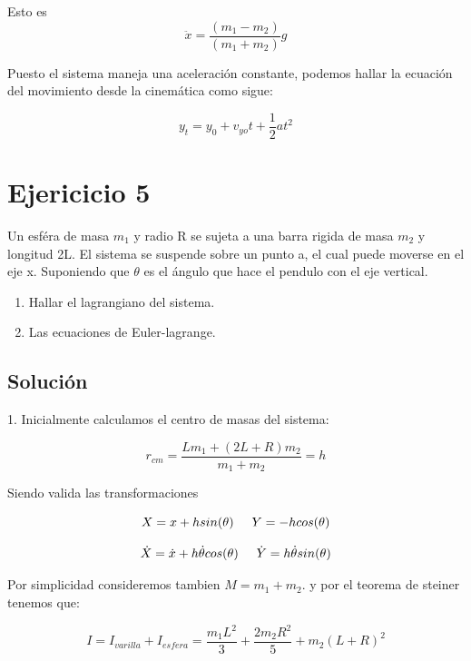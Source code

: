 \documentclass[12 pt]{article}
\begin{document}
Esto es
\begin{equation*}
\ddot{x}= \dfrac{(m_{1}-m_{2})}{(m_{1}+m_{2})} g
\end{equation*}

Puesto el sistema maneja una aceleración constante, podemos hallar la ecuación del movimiento desde la cinemática como sigue:

$$ y_{t}= y_{0}+v_{yo}t+\frac{1}{2}at^{2} $$

\section*{Ejericicio 5}
Un esféra de masa $m_{1}$ y radio R se sujeta a una barra rigida de  masa $m_{2}$ y longitud 2L. El sistema se suspende sobre un punto a, el cual puede moverse en el eje x.
Suponiendo que $\theta$ es el ángulo que hace el pendulo con el eje vertical.

\begin{enumerate}
	\item Hallar el lagrangiano del sistema.
	\item Las ecuaciones de Euler-lagrange.
\end{enumerate}



\subsection*{Solución}

1. Inicialmente calculamos el centro de masas del sistema:

\begin{equation*}
r_{cm}= \dfrac{L m_{1} + (2L + R)m_{2}}{m_{1}+m_{2}} =h
\end{equation*}

Siendo valida las transformaciones


\begin{equation*}
X = x + h sin(\theta) \hspace{0.5cm} Y= -h cos(\theta)
\end{equation*}

\begin{equation*}
\dot{X}= \dot{x} + h \dot{\theta}cos(\theta) \hspace{0.5cm} \dot{Y}= h \dot{\theta}sin(\theta)
\end{equation*}

Por simplicidad consideremos tambien $ M = m_{1} + m_{2}$. y por el teorema de steiner tenemos que: 

\begin{equation*}
I = I_{varilla} + I_{esfera} = \frac{m_{1}L^{2}}{3} + \frac{2m_{2} R^{2}}{5} + m_{2} (L+R)^{2} 
\end{equation*}
\end{document}
